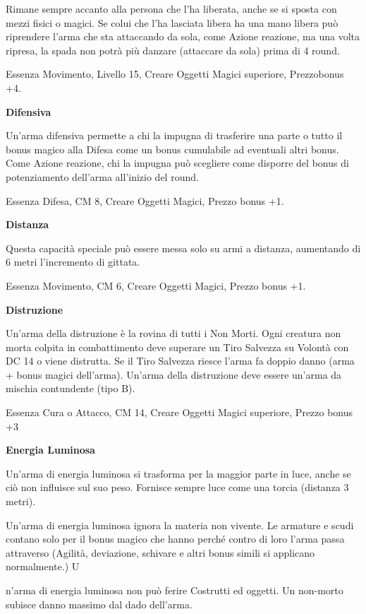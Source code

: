 \documentclass[a4paper,11pt,twoside,openany]{book}
\begin{document}
Rimane sempre accanto alla persona che l'ha liberata, anche se si sposta con mezzi fisici o magici. Se colui che l'ha lasciata libera ha una mano libera può riprendere l'arma che sta attaccando da sola, come Azione reazione, ma una volta ripresa, la spada non potrà più danzare (attaccare da sola) prima di 4 round.

Essenza Movimento, Livello 15, Creare Oggetti Magici superiore, Prezzobonus +4.

\textbf{Difensiva}

Un'arma difensiva permette a chi la impugna di trasferire una parte o tutto il bonus magico alla Difesa come un bonus cumulabile ad eventuali altri bonus. Come Azione reazione, chi la impugna può scegliere come disporre del bonus di potenziamento dell'arma all'inizio del round.

Essenza Difesa, CM 8, Creare Oggetti Magici, Prezzo bonus +1.

\textbf{Distanza}

Questa capacità speciale può essere messa solo su armi a distanza, aumentando di 6 metri l'incremento di gittata.

Essenza Movimento, CM 6, Creare Oggetti Magici, Prezzo bonus +1.

\textbf{Distruzione}

Un'arma della distruzione è la rovina di tutti i Non Morti. Ogni creatura non morta colpita in combattimento deve superare un Tiro Salvezza su Volontà con DC 14 o viene distrutta. Se il Tiro Salvezza riesce l'arma fa doppio danno (arma + bonus magici dell'arma). Un'arma della distruzione deve essere un'arma da mischia contundente (tipo B).

Essenza Cura o Attacco, CM 14, Creare Oggetti Magici superiore, Prezzo bonus +3

\textbf{Energia Luminosa}

Un'arma di energia luminosa si trasforma per la maggior parte in luce, anche se ciò non influisce sul suo peso. Fornisce sempre luce come una torcia (distanza 3 metri).

Un'arma di energia luminosa ignora la materia non vivente. Le armature e scudi contano solo per il bonus magico che hanno perché contro di loro l'arma passa attraverso (Agilità, deviazione, schivare e altri bonus simili si applicano normalmente.) U

n'arma di energia luminosa non può ferire Costrutti ed oggetti. Un non-morto subisce danno massimo dal dado dell'arma.
\end{document}
